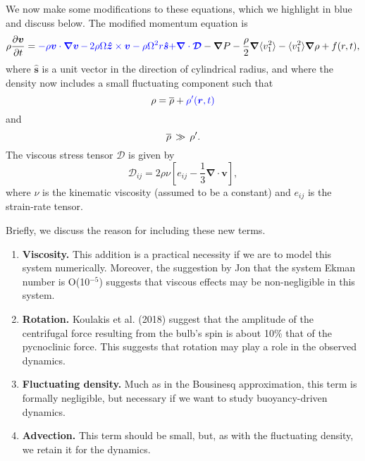 We now make some modifications to these equations, which we highlight in blue and discuss below.  The modified momentum equation is
\begin{equation}
\rho\frac{ \partial \vvec }{\partial t}   =  {\color{blue} - \rho\vvec\cdot\boldsymbol{\nabla}\vvec}
{\color{blue} \,-\, 2\rho\Omega\boldsymbol{\hat{z}}\times\vvec  - \rho\Omega^2r\boldsymbol{\hat{s}}}
{\color{blue} + \boldsymbol{\nabla}\cdot\boldsymbol{\mathcal{D}}}
-\boldsymbol{\nabla}P  %
						        - \frac{\rho}{2}\boldsymbol{\nabla}\langle v_1^2\rangle
							- \langle v_1^2\rangle\boldsymbol{\nabla}\rho
							+ f(r,t),
\end{equation}
where $\boldsymbol{\hat{s}}$ is a unit vector in the direction of cylindrical radius, and where the density now includes a small fluctuating component such that
\begin{equation}
\rho = \overline{\rho} +{\color{blue} \rho'(\boldsymbol{r},t)}
\end{equation}
and
\begin{equation}
\overline{\rho} \,\gg\, \rho'.
\end{equation}
The viscous stress tensor $\boldsymbol{\mathcal{D}}$ is given by
\begin{equation}
\mathcal{D}_{ij} = 2\rho\nu\left[e_{ij}-\frac{1}{3}\boldsymbol{\nabla}\cdot\boldsymbol{v}\right],
\end{equation}
where $\nu$ is the kinematic viscosity (assumed to be a constant) and $e_{ij}$ is the strain-rate tensor.  

Briefly, we discuss the reason for including these new terms.
\begin{enumerate}
\item {\bf Viscosity. }  This addition is a practical necessity if we are to model this system numerically.  Moreover, the suggestion by Jon that the system Ekman number is O(10$^{-5}$) suggests that viscous effects may be non-negligible in this system.
\item {\bf Rotation. }  Koulakis et al. (2018) suggest that the amplitude of the centrifugal force resulting from the bulb's spin is about 10\% that of the pycnoclinic force.   This suggests that rotation may play a role in the observed dynamics.
\item {\bf Fluctuating density.}  Much as in the Bousinesq approximation, this term is formally negligible, but necessary if we want to study buoyancy-driven dynamics.  
\item {\bf Advection. }  This term should be small, but, as with the fluctuating density, we retain it for the dynamics. 
\end{enumerate}

